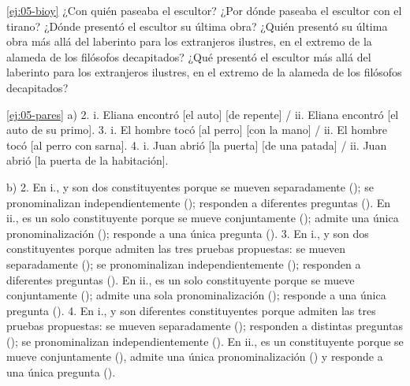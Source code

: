 \begin{solucion}{\ref{ej:05-bioy}}
¿Con quién paseaba el escultor? ¿Por dónde paseaba el escultor con el tirano?
¿Dónde presentó el escultor su última obra? ¿Quién presentó su última obra más
allá del laberinto para los extranjeros ilustres, en el extremo de la alameda de
los filósofos decapitados? ¿Qué presentó el escultor más allá del laberinto para
los extranjeros ilustres, en el extremo de la alameda de los filósofos
decapitados?
\end{solucion}

\begin{solucion}{\ref{ej:05-pares}}
a) 2. i. Eliana encontró [el auto] [de repente] / ii. Eliana encontró [el auto
de su primo]. 3. i. El hombre tocó [al perro] [con la mano] / ii. El hombre tocó
[al perro con sarna]. 4. i. Juan abrió [la puerta] [de una patada] / ii. Juan
abrió [la puerta de la habitación].

b) 2. En i.,  y  son dos constituyentes porque
se mueven separadamente (); se pronominalizan independientemente
(); responden a
diferentes preguntas (). En ii.,  es un solo constituyente
porque se mueve conjuntamente ();
admite una única pronominalización (); responde a una
única pregunta (). 3. En i.,  y
 son dos constituyentes porque admiten las tres pruebas
propuestas: se mueven separadamente (); se pronominalizan independientemente
(); responden
a diferentes preguntas (). En ii.,  es un solo
constituyente porque se mueve conjuntamente (); admite una sola pronominalización (); responde
a una única pregunta (). 4. En i.,  y  son diferentes constituyentes porque admiten las
tres pruebas propuestas: se mueven separadamente (); responden a distintas preguntas
(); se
pronominalizan independientemente (). En ii.,  es un
constituyente porque se mueve conjuntamente (), admite una única pronominalización () y
responde a una única pregunta ().
\end{solucion}

